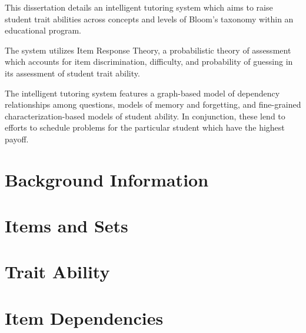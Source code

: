\documentclass[12pt,letterpaper]{lsuetd}
\begin{document}
\renewenvironment{abstract}{{\hspace{-2.2em} \huge \textbf{\abstractname}} \par}{\pagebreak}
\begin{abstract}
\vspace{0.55ex}
\doublespacing

This dissertation details an intelligent tutoring system which aims to raise
student trait abilities across concepts and levels of Bloom's taxonomy within
an educational program.  

The system utilizes Item Response Theory, a probabilistic theory of assessment
which accounts for item discrimination, difficulty, and probability of guessing
in its assessment of student trait ability.

The intelligent tutoring system features a graph-based model of dependency
relationships among questions, models of memory and forgetting, and
fine-grained characterization-based models of student ability.  In conjunction,
these lend to efforts to schedule problems for the particular student which
have the highest payoff.

\end{abstract}

\singlespacing
\setlength{\textfloatsep}{12pt plus 2pt minus 2pt}
\setlength{\intextsep}{6pt plus 2pt minus 2pt}
\chapter{Background Information}
\doublespacing

\pagebreak
\singlespacing
\chapter{Items and Sets}
\doublespacing

\pagebreak
\singlespacing
\chapter{Trait Ability}
\doublespacing

\pagebreak
\singlespacing
\chapter{Item Dependencies}
\doublespacing

\pagebreak
\singlespacing
\end{document}
